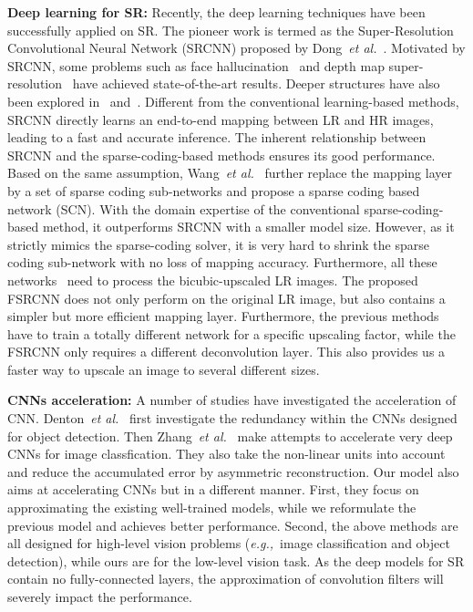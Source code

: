 \documentclass[runningheads]{llncs}
\newcommand{\etal}{\emph{et al.}}
\newcommand{\eg}{\emph{e.g.,}}
\begin{document}
\noindent
\textbf{Deep learning for SR:}
Recently, the deep learning techniques have been successfully applied on SR. The pioneer work is termed as the Super-Resolution Convolutional Neural Network (SRCNN) proposed by Dong~\etal~\cite{Dong2014,Dong2015}. Motivated by SRCNN, some problems such as face hallucination~\cite{Zhu2016} and depth map super-resolution~\cite{Hui2016} have achieved state-of-the-art results. Deeper structures have also been explored in~\cite{Kim2015a} and~\cite{Kim2015}. Different from the conventional learning-based methods, SRCNN directly learns an end-to-end mapping between LR and HR images, leading to a fast and accurate inference. The inherent relationship between SRCNN and the sparse-coding-based methods ensures its good performance.   Based on the same assumption, Wang~\etal~\cite{Wang2015} further replace the mapping layer by a set of sparse coding sub-networks and propose a sparse coding based network (SCN). With the domain expertise of the conventional sparse-coding-based method, it outperforms SRCNN with a smaller model size. However, as it strictly mimics the sparse-coding solver, it is very hard to shrink the sparse coding sub-network with no loss of mapping accuracy. Furthermore, all these networks~\cite{Wang2015,Kim2015a,Kim2015} need to process the bicubic-upscaled LR images.
The proposed FSRCNN does not only perform on the original LR image, but also contains a simpler but more efficient mapping layer. Furthermore, the previous methods have to train a totally different network for a specific upscaling factor, while the FSRCNN only requires a different deconvolution layer. This also provides us a faster way to upscale an image to several different sizes.


\noindent
\textbf{CNNs acceleration:} A number of studies have investigated the acceleration of CNN. Denton~\etal~\cite{Denton2014} first investigate the redundancy within the CNNs designed for object detection. Then Zhang~\etal~\cite{Zhang2015} make attempts to accelerate very deep CNNs for image classfication. They also take the non-linear units into account and reduce the accumulated error by asymmetric reconstruction.
Our model also aims at accelerating CNNs but in a different manner. First, they focus on approximating the existing well-trained models, while we reformulate the previous model and achieves better performance. Second, the above methods are all designed for high-level vision problems (\eg~image classification and object detection), while ours are for the low-level vision task. As the deep models for SR contain no fully-connected layers, the approximation of convolution filters will severely impact the performance. 
\end{document}
